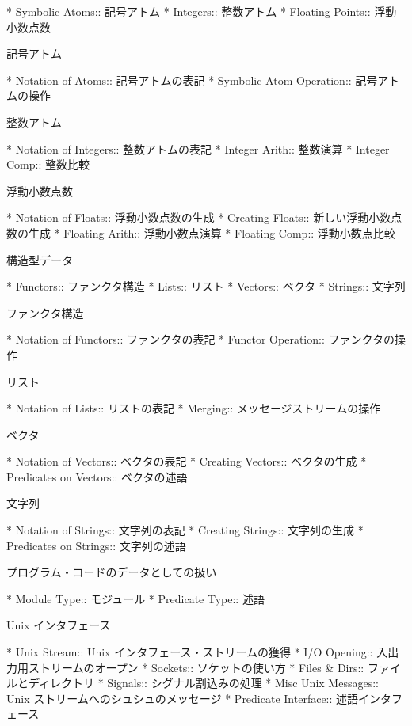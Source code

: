 * Symbolic Atoms::              記号アトム
* Integers::                    整数アトム
* Floating Points::             浮動小数点数

記号アトム

* Notation of Atoms::           記号アトムの表記
* Symbolic Atom Operation::     記号アトムの操作

整数アトム

* Notation of Integers::        整数アトムの表記
* Integer Arith::               整数演算
* Integer Comp::                整数比較

浮動小数点数

* Notation of Floats::          浮動小数点数の生成
* Creating Floats::             新しい浮動小数点数の生成
* Floating Arith::              浮動小数点演算
* Floating Comp::               浮動小数点比較

構造型データ

* Functors::                    ファンクタ構造
* Lists::                       リスト
* Vectors::                     ベクタ
* Strings::                     文字列

ファンクタ構造

* Notation of Functors::        ファンクタの表記
* Functor Operation::           ファンクタの操作

リスト

* Notation of Lists::           リストの表記
* Merging::                     メッセージストリームの操作

ベクタ

* Notation of Vectors::         ベクタの表記
* Creating Vectors::            ベクタの生成
* Predicates on Vectors::       ベクタの述語

文字列

* Notation of Strings::         文字列の表記
* Creating Strings::            文字列の生成
* Predicates on Strings::       文字列の述語

プログラム・コードのデータとしての扱い

* Module Type::                 モジュール
* Predicate Type::              述語

Unix インタフェース

* Unix Stream::                 Unix インタフェース・ストリームの獲得
* I/O Opening::                 入出力用ストリームのオープン
* Sockets::                     ソケットの使い方
* Files & Dirs::                ファイルとディレクトリ
* Signals::                     シグナル割込みの処理
* Misc Unix Messages::          Unix ストリームへのシュシュのメッセージ
* Predicate Interface::         述語インタフェース

